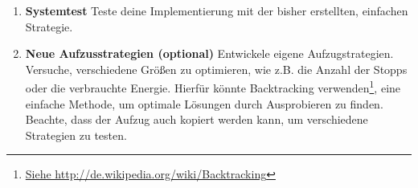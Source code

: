 \documentclass[
  accentcolor=tud1c,	%
  colorbacktitle,		%
  inverttitle,			%
  german,				%
  twoside
]{tudexercise}
\begin{document}
\begin{enumerate}
\begin{algorithm}[H]
{   Move Elevator to next floor; \\
   Let all arrived people off; \\
   Let all people on floor into Elevator;\\
 }
\end{algorithm}

\item \textbf{Systemtest} 
Teste deine Implementierung mit der bisher erstellten, einfachen Strategie.

\item \textbf{Neue Aufzusstrategien (optional)}
Entwickele eigene Aufzugstrategien. 
Versuche, verschiedene Größen zu optimieren, wie z.B. die Anzahl der Stopps oder die verbrauchte Energie.
Hierfür könnte Backtracking verwenden\footnote{\url{Siehe http://de.wikipedia.org/wiki/Backtracking}}, eine einfache Methode, um optimale Lösungen durch Ausprobieren zu finden. Beachte, dass der Aufzug auch kopiert werden kann, um verschiedene Strategien zu testen.

\end{enumerate}
\end{document}
